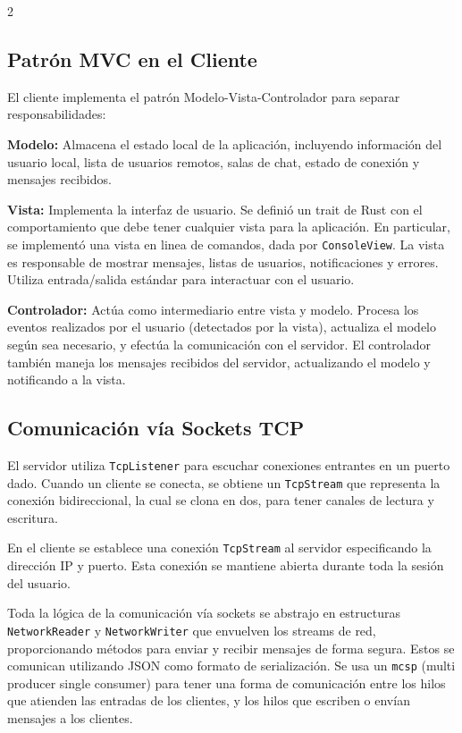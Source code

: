 \documentclass[letter,11pt]{article}
\begin{document}
\begin{multicols}{2}
\subsection{Patrón MVC en el Cliente}

El cliente implementa el patrón Modelo-Vista-Controlador para separar responsabilidades:

\textbf{Modelo:} Almacena el estado local de la aplicación, incluyendo información del usuario local, lista de usuarios remotos, salas de chat, estado de conexión y mensajes recibidos.

\textbf{Vista:} Implementa la interfaz de usuario. Se definió un trait de Rust con el comportamiento que debe tener cualquier vista para la aplicación. En particular, se implementó una vista en linea de comandos, dada por \texttt{ConsoleView}. La vista es responsable de mostrar mensajes, listas de usuarios, notificaciones y errores. Utiliza entrada/salida estándar para interactuar con el usuario.

\textbf{Controlador:} Actúa como intermediario entre vista y modelo. Procesa los eventos realizados por el usuario (detectados por la vista), actualiza el modelo según sea necesario, y efectúa la comunicación con el servidor. El controlador también maneja los mensajes recibidos del servidor, actualizando el modelo y notificando a la vista.

\subsection{Comunicación vía Sockets TCP}

El servidor utiliza \texttt{TcpListener} para escuchar conexiones entrantes en un puerto dado. Cuando un cliente se conecta, se obtiene un \texttt{TcpStream} que representa la conexión bidireccional, la cual se clona en dos, para tener canales de lectura y escritura.

En el cliente se establece una conexión \texttt{TcpStream} al servidor especificando la dirección IP y puerto. Esta conexión se mantiene abierta durante toda la sesión del usuario.

Toda la lógica de la comunicación vía sockets se abstrajo en estructuras \texttt{NetworkReader} y \texttt{NetworkWriter} que envuelven los streams de red, proporcionando métodos para enviar y recibir mensajes de forma segura. Estos se comunican utilizando JSON como formato de serialización. Se usa un \texttt{mcsp} (multi producer single consumer) para tener una forma de comunicación entre los hilos que atienden las entradas de los clientes, y los hilos que escriben o envían mensajes a los clientes.


\end{multicols}
\end{document}
